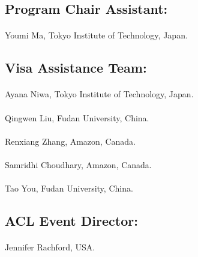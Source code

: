\subsection*{Program Chair Assistant:}
\paragraph{} Youmi Ma, Tokyo Institute of Technology, Japan.

\subsection*{Visa Assistance Team:}
\paragraph{} Ayana Niwa, Tokyo Institute of Technology, Japan.
\paragraph{} Qingwen Liu, Fudan University, China.
\paragraph{} Renxiang Zhang, Amazon, Canada.
\paragraph{} Samridhi Choudhary, Amazon, Canada.
\paragraph{} Tao You, Fudan University, China.
\subsection*{ACL Event Director:}
\paragraph{} Jennifer Rachford, USA.
